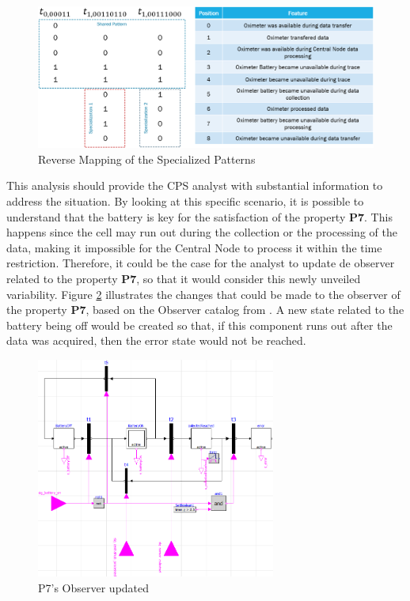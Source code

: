 \begin{figure}[!h]
	\centering
	\includegraphics[width=\textwidth, keepaspectratio]{img/pattern_specialization_reverse_map.png}
	\caption{Reverse Mapping of the Specialized Patterns}
	\label{fig:ev_pattern_spec_reverse_mapping}
\end{figure}

This analysis should provide the CPS analyst with substantial information to address the situation. By looking at this specific scenario, it is possible to understand that the battery is key for the satisfaction of the property \textbf{P7}. This happens since the cell may run out during the collection or the processing of the data, making it impossible for the Central Node to process it within the time restriction. Therefore, it could be the case for the analyst to update de observer related to the property \textbf{P7}, so that it would consider this newly unveiled variability. Figure \ref{fig:ev_observer_fxd} illustrates the changes that could be made to the observer of the property \textbf{P7}, based on the Observer catalog from \cite{2022PSP}. A new state related to the battery being off would be created so that, if this component runs out after the data was acquired, then the error state would not be reached.

\begin{figure}[]
	\centering
	\includegraphics[width=0.7\textwidth, keepaspectratio]{img/observer_fxd.png}
	\caption{P7's Observer updated}
	\label{fig:ev_observer_fxd}
\end{figure}


